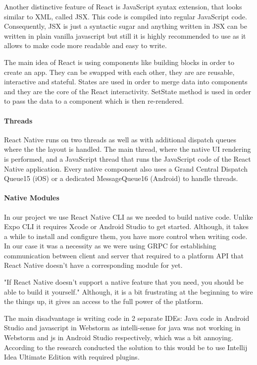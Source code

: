 Another distinctive feature of React is JavaScript syntax extension, that looks similar to XML, called JSX. This code is compiled into regular JavaScript
code. Consequently, JSX is just a syntactic sugar and anything written in JSX can be written in plain vanilla javascript but still it is highly recommended to use as it allows to make code more readable and easy to write. 

The main idea of React is using components like building blocks in order to create an app. They can be swapped with each other, they are are reusable, interactive and stateful. 
States are used in order to merge data into components and they are the core of the React interactivity. SetState method is used in order to pass the data to a component which is then re-rendered.
\paragraph{Threads}
React Native runs on two threads as well as with additional dispatch
queues where the the layout is handled. The main thread, where the native UI rendering is performed, and a JavaScript thread that runs the JavaScript code of the React Native application. Every native component also uses a Grand Central Dispatch
Queue15 (iOS) or a dedicated MessageQueue16 (Android) to handle threads.

\paragraph{Native Modules}
In our project we use React Native CLI as we needed to build native code.
Unlike Expo CLI it requires Xcode or Android Studio to get started. Although, it takes a while to install and configure them, you have more control when writing code. In our case it was a necessity as we were using GRPC for establishing communication between client and server that required to a platform API that React Native doesn't have a corresponding module for yet.

"If React Native doesn't support a native feature that you need, you should be able to build it yourself." Although, it is a bit frustrating at the beginning to wire the things up, it gives an access to the full power of the platform. 

The main disadvantage is writing code in 2 separate IDEs: Java code in Android Studio and javascript in Webstorm as intelli-sense for java was not working in Webstorm and js in Android Studio respectively, which was a bit annoying. According to the research conducted the solution to this would be to use Intellij Idea Ultimate Edition with required plugins.


